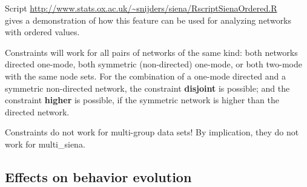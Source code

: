 \documentclass[a4paper,fleqn,11pt]{article}
\newcommand{\+}{\, + \,}
\begin{document}
Script { \small \url{http://www.stats.ox.ac.uk/~snijders/siena/RscriptSienaOrdered.R}}\\
gives a demonstration of how this feature can be used for analyzing networks
with ordered values.
\medskip

Constraints will work for all pairs of networks of the same kind:
both networks directed one-mode, both symmetric (non-directed) one-mode,
or both two-mode with the same node sets.
For the combination of a one-mode directed and a symmetric non-directed
network, the constraint \textbf{disjoint} is possible;
and the constraint \textbf{higher} is possible,
if the symmetric network is higher than the directed network.

Constraints do not work for multi-group data sets! By implication,
they do not work for \textsf{multi\_siena}.


\subsection{Effects on behavior evolution}
\label{S_eff_beh}
\end{document}
